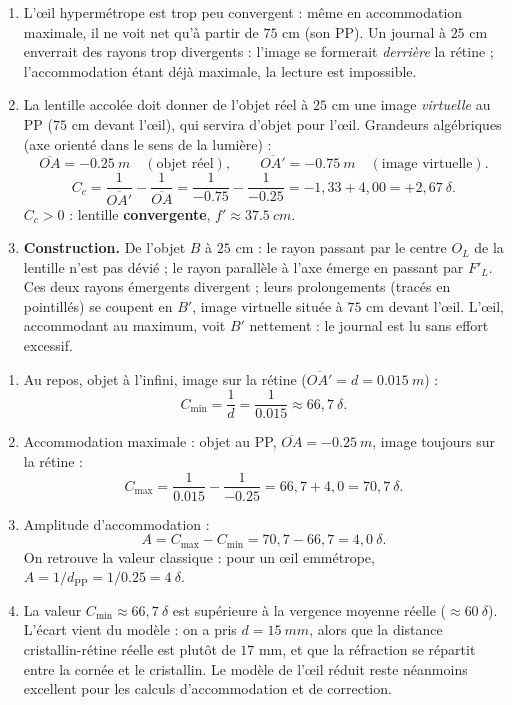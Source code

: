 \documentclass[11pt]{article}
\begin{document}
\begin{corrige}
\begin{enumerate}
\item L'œil hypermétrope est trop peu convergent : même en accommodation maximale, il ne voit net qu'à partir de $75$ cm (son PP). Un journal à $25$ cm enverrait des rayons trop divergents : l'image se formerait \emph{derrière} la rétine ; l'accommodation étant déjà maximale, la lecture est impossible.
\item La lentille accolée doit donner de l'objet réel à $25$ cm une image \emph{virtuelle} au PP ($75$ cm devant l'œil), qui servira d'objet pour l'œil. Grandeurs algébriques (axe orienté dans le sens de la lumière) :
\[ \overline{OA} = -\SI{0,25}{m} \quad (\text{objet réel}), \qquad \overline{OA'} = -\SI{0,75}{m} \quad (\text{image virtuelle}). \]
\[ C_c = \frac{1}{\overline{OA'}} - \frac{1}{\overline{OA}} = \frac{1}{-\num{0,75}} - \frac{1}{-\num{0,25}} = -1,33 + 4,00 = +2,67\ \delta. \]
$C_c > 0$ : lentille \textbf{convergente}, $f' \approx \SI{37,5}{cm}$.
\item \textbf{Construction.} De l'objet $B$ à $25$ cm : le rayon passant par le centre $O_L$ de la lentille n'est pas dévié ; le rayon parallèle à l'axe émerge en passant par $F'_L$. Ces deux rayons émergents divergent ; leurs prolongements (tracés en pointillés) se coupent en $B'$, image virtuelle située à $75$ cm devant l'œil. L'œil, accommodant au maximum, voit $B'$ nettement : le journal est lu sans effort excessif.
\end{enumerate}
\end{corrige}

\begin{corrige}
\begin{enumerate}
\item Au repos, objet à l'infini, image sur la rétine ($\overline{OA'} = d = \SI{0,015}{m}$) :
\[ C_{\min} = \frac{1}{d} = \frac{1}{\num{0,015}} \approx 66,7\ \delta. \]
\item Accommodation maximale : objet au PP, $\overline{OA} = -\SI{0,25}{m}$, image toujours sur la rétine :
\[ C_{\max} = \frac{1}{\num{0,015}} - \frac{1}{-\num{0,25}} = 66,7 + 4,0 = 70,7\ \delta. \]
\item Amplitude d'accommodation :
\[ A = C_{\max} - C_{\min} = 70,7 - 66,7 = 4,0\ \delta. \]
On retrouve la valeur classique : pour un œil emmétrope, $A = 1/d_{\mathrm{PP}} = 1/\num{0,25} = 4\ \delta$.
\item La valeur $C_{\min} \approx 66,7\ \delta$ est supérieure à la vergence moyenne réelle ($\approx 60\ \delta$). L'écart vient du modèle : on a pris $d = \SI{15}{mm}$, alors que la distance cristallin-rétine réelle est plutôt de $17$ mm, et que la réfraction se répartit entre la cornée et le cristallin. Le modèle de l'œil réduit reste néanmoins excellent pour les calculs d'accommodation et de correction.
\end{enumerate}
\end{corrige}
\end{document}
